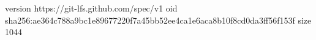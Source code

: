 version https://git-lfs.github.com/spec/v1
oid sha256:ae364c788a9bc1e89677220f7a45bb52ee4ca1e6aca8b10f8cd0da3ff56f153f
size 1044
